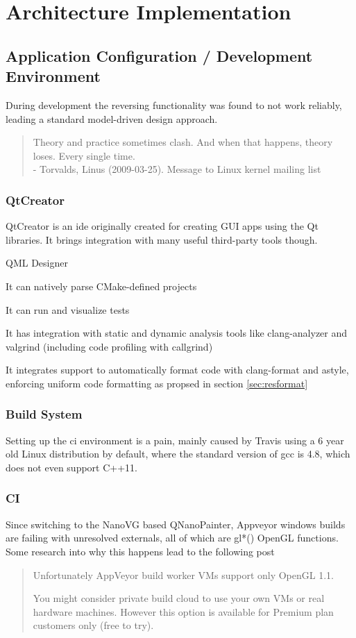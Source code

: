\chapter{Architecture Implementation}
\section{Application Configuration / Development Environment}

During development the reversing functionality was found to not work reliably, leading a standard model-driven design approach.

\begin{quote}
Theory and practice sometimes clash. And when that happens, theory loses. Every single time.\\
- Torvalds, Linus (2009-03-25). Message to Linux kernel mailing list
\end{quote}
\subsection{QtCreator}

QtCreator is an \gls{ide} originally created for creating GUI apps using the Qt libraries. It brings integration with many useful third-party tools though.

QML Designer

It can natively parse CMake-defined projects

It can run and visualize tests

It has integration with static and dynamic analysis tools like clang-analyzer and valgrind (including code profiling with callgrind)

It integrates support to automatically format code with clang-format and astyle, enforcing uniform code formatting as propsed in section \ref{sec:resformat}


\subsection{Build System}
Setting up the \gls{ci} environment is a pain, mainly caused by Travis using a 6 year old Linux distribution by default, where the standard version of gcc is 4.8, which does not even support C++11.

\subsection{CI}
Since switching to the NanoVG based QNanoPainter, Appveyor windows builds are failing with unresolved externals, all of which are gl*() OpenGL functions.
Some research into why this happens lead to the following post
\begin{quote}
Unfortunately AppVeyor build worker VMs support only OpenGL 1.1.

You might consider private build cloud to use your own VMs or real hardware machines. However this option is available for Premium plan customers only (free to try).
\end{quote}

